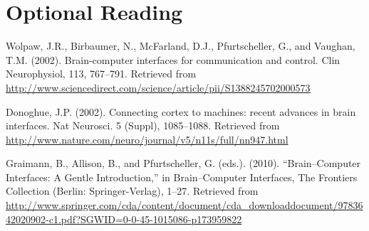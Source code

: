 \documentclass[12pt]{article}
\begin{document}
\section*{Optional Reading}

\begin{enumerate}[leftmargin=0.6cm, label={[\arabic*]}]

\setcounter{enumi}{2}

\item Wolpaw, J.R., Birbaumer, N., McFarland, D.J., Pfurtscheller, G., and Vaughan, T.M. (2002). Brain-computer interfaces for communication and control. Clin Neurophysiol, 113, 767--791. Retrieved from \url{http://www.sciencedirect.com/science/article/pii/S1388245702000573}

\item Donoghue, J.P. (2002). Connecting cortex to machines: recent advances in brain interfaces. Nat Neurosci. 5 (Suppl), 1085--1088. Retrieved from \url{http://www.nature.com/neuro/journal/v5/n11s/full/nn947.html}

\sloppy

\item Graimann, B., Allison, B., and Pfurtscheller, G. (eds.). (2010). “Brain–Computer Interfaces: A Gentle Introduction,” in Brain–Computer Interfaces, The Frontiers Collection (Berlin: Springer-Verlag), 1--27. Retrieved from \url{http://www.springer.com/cda/content/document/cda_downloaddocument/9783642020902-c1.pdf?SGWID=0-0-45-1015086-p173959822}

\end{enumerate}
\end{document}

